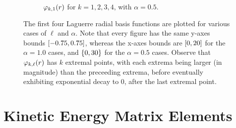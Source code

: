 \documentclass[]{article}
\begin{document}
\begin{figure}[h]
\begin{subfigure}[b]{0.45\linewidth}
    \caption{$\varphi_{k, 1}(r)$ for $k = 1, 2, 3, 4$, with $\alpha = 0.5$.}
    \label{fig:laguerre-1-0.5}
  \end{subfigure}

  \caption{
    The first four Laguerre radial basis functions are plotted for various cases
    of $\ell$ and $\alpha$.
    Note that every figure has the same y-axes bounds $[-0.75, 0.75]$,
    whereas the x-axes bounds are $[0, 20]$ for the $\alpha = 1.0$ cases,
    and $\lbrace0, 30\rbrace$ for the $\alpha = 0.5$ cases.
    Observe that $\varphi_{k, \ell}(r)$ has $k$ extremal points, with
    each extrema being larger (in magnitude) than the preceeding extrema, before
    eventually exhibiting exponential decay to 0, after the last extremal point.
  }
  \label{fig:laguerre}
\end{figure}


\section{Kinetic Energy Matrix Elements}
\label{sec:kinet-energy-matr}

\end{document}
